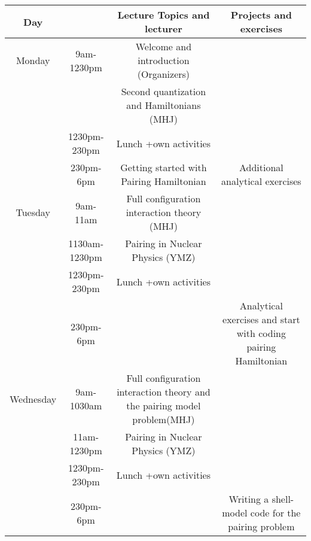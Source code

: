 \documentclass{beamer}
\begin{document}
\begin{frame}
\begin{block}{}
{\footnotesize
\begin{tabular}{cccc}
\hline
\multicolumn{1}{c}{ Day } & \multicolumn{1}{c}{  } & \multicolumn{1}{c}{ Lecture Topics and lecturer } & \multicolumn{1}{c}{ Projects and exercises } \\
\hline
Monday    & 9am-1230pm    & Welcome  and introduction (Organizers)                                   &                                                                \\
          &               & Second quantization  and Hamiltonians (MHJ)                              &                                                                \\
          & 1230pm-230pm  & Lunch +own activities                                                    &                                                                \\
          & 230pm-6pm     & Getting started with Pairing Hamiltonian                                 & Additional analytical exercises                                \\
\hline
Tuesday   & 9am-11am      & Full configuration interaction theory (MHJ)                              &                                                                \\
          & 1130am-1230pm & Pairing in Nuclear Physics (YMZ)                                         &                                                                \\
          & 1230pm-230pm  & Lunch +own activities                                                    &                                                                \\
          & 230pm-6pm     &                                                                          & Analytical exercises and start with coding pairing Hamiltonian \\
\hline
Wednesday & 9am-1030am    & Full configuration interaction theory and the pairing model problem(MHJ) &                                                                \\
          & 11am-1230pm   & Pairing in Nuclear Physics (YMZ)                                         &                                                                \\
          & 1230pm-230pm  & Lunch +own activities                                                    &                                                                \\
          & 230pm-6pm     &                                                                          & Writing a shell-model code for the pairing problem             \\

\end{tabular}}
\end{block}
\end{frame}
\end{document}
